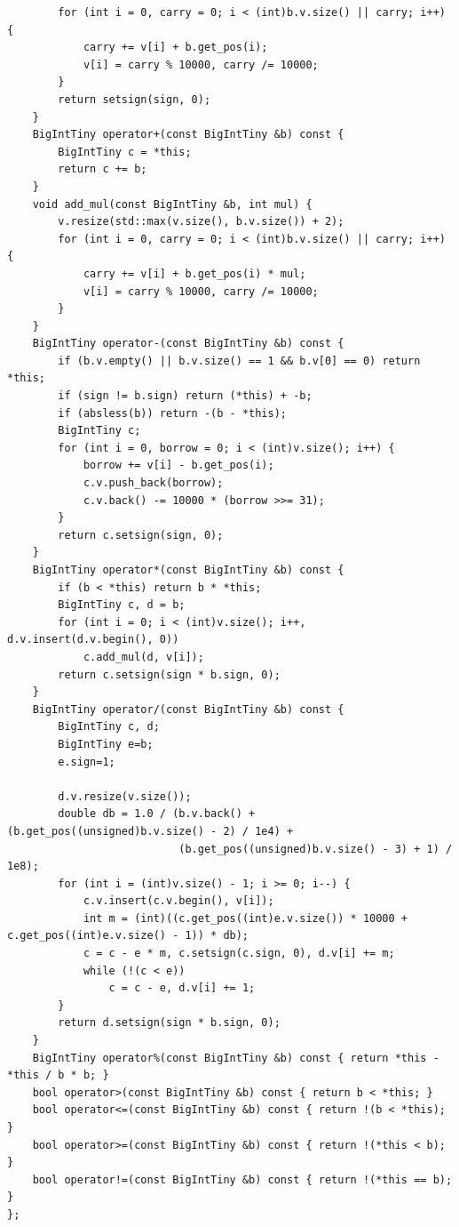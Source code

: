 \documentclass[UTF8,twoside]{ctexart}
\begin{document}
\begin{lstlisting}
        for (int i = 0, carry = 0; i < (int)b.v.size() || carry; i++) {
            carry += v[i] + b.get_pos(i);
            v[i] = carry % 10000, carry /= 10000;
        }
        return setsign(sign, 0);
    }
    BigIntTiny operator+(const BigIntTiny &b) const {
        BigIntTiny c = *this;
        return c += b;
    }
    void add_mul(const BigIntTiny &b, int mul) {
        v.resize(std::max(v.size(), b.v.size()) + 2);
        for (int i = 0, carry = 0; i < (int)b.v.size() || carry; i++) {
            carry += v[i] + b.get_pos(i) * mul;
            v[i] = carry % 10000, carry /= 10000;
        }
    }
    BigIntTiny operator-(const BigIntTiny &b) const {
        if (b.v.empty() || b.v.size() == 1 && b.v[0] == 0) return *this;
        if (sign != b.sign) return (*this) + -b;
        if (absless(b)) return -(b - *this);
        BigIntTiny c;
        for (int i = 0, borrow = 0; i < (int)v.size(); i++) {
            borrow += v[i] - b.get_pos(i);
            c.v.push_back(borrow);
            c.v.back() -= 10000 * (borrow >>= 31);
        }
        return c.setsign(sign, 0);
    }
    BigIntTiny operator*(const BigIntTiny &b) const {
        if (b < *this) return b * *this;
        BigIntTiny c, d = b;
        for (int i = 0; i < (int)v.size(); i++, d.v.insert(d.v.begin(), 0))
            c.add_mul(d, v[i]);
        return c.setsign(sign * b.sign, 0);
    }
    BigIntTiny operator/(const BigIntTiny &b) const {
        BigIntTiny c, d;
        BigIntTiny e=b;
        e.sign=1;

        d.v.resize(v.size());
        double db = 1.0 / (b.v.back() + (b.get_pos((unsigned)b.v.size() - 2) / 1e4) +
                           (b.get_pos((unsigned)b.v.size() - 3) + 1) / 1e8);
        for (int i = (int)v.size() - 1; i >= 0; i--) {
            c.v.insert(c.v.begin(), v[i]);
            int m = (int)((c.get_pos((int)e.v.size()) * 10000 + c.get_pos((int)e.v.size() - 1)) * db);
            c = c - e * m, c.setsign(c.sign, 0), d.v[i] += m;
            while (!(c < e))
                c = c - e, d.v[i] += 1;
        }
        return d.setsign(sign * b.sign, 0);
    }
    BigIntTiny operator%(const BigIntTiny &b) const { return *this - *this / b * b; }
    bool operator>(const BigIntTiny &b) const { return b < *this; }
    bool operator<=(const BigIntTiny &b) const { return !(b < *this); }
    bool operator>=(const BigIntTiny &b) const { return !(*this < b); }
    bool operator!=(const BigIntTiny &b) const { return !(*this == b); }
};
\end{lstlisting}
\end{document}

